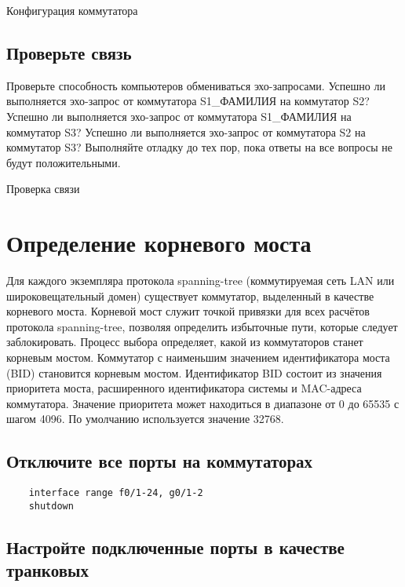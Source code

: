 \begin{image}
	\caption{Конфигурация коммутатора}
	\label{fig:switch:switch:1}
\end{image}

\subsection{Проверьте связь}
Проверьте способность компьютеров обмениваться эхо-запросами.
Успешно ли выполняется эхо-запрос от коммутатора S1\_ФАМИЛИЯ на
коммутатор S2? Успешно ли выполняется эхо-запрос от коммутатора
S1\_ФАМИЛИЯ на коммутатор S3? Успешно ли выполняется эхо-запрос от
коммутатора S2 на коммутатор S3?
Выполняйте отладку до тех пор, пока ответы на все вопросы не будут положительными.

\begin{image}
	\caption{Проверка связи}
	\label{fig:switch:ping}
\end{image}

\section{Определение корневого моста}
Для каждого экземпляра протокола spanning-tree
(коммутируемая сеть LAN или широковещательный домен) существует коммутатор,
выделенный в качестве корневого моста. Корневой мост служит точкой привязки
для всех расчётов протокола spanning-tree,
позволяя определить избыточные пути, которые следует заблокировать.
Процесс выбора определяет, какой из коммутаторов станет корневым мостом.
Коммутатор с наименьшим значением идентификатора моста (BID)
становится корневым мостом.
Идентификатор BID состоит из значения приоритета моста,
расширенного идентификатора системы и MAC-адреса коммутатора.
Значение приоритета может находиться в диапазоне от 0 до 65535 с шагом 4096.
По умолчанию используется значение 32768.

\subsection{Отключите все порты на коммутаторах}

\begin{verbatim}
	interface range f0/1-24, g0/1-2
	shutdown
\end{verbatim}

\subsection{Настройте подключенные порты в качестве транковых}

